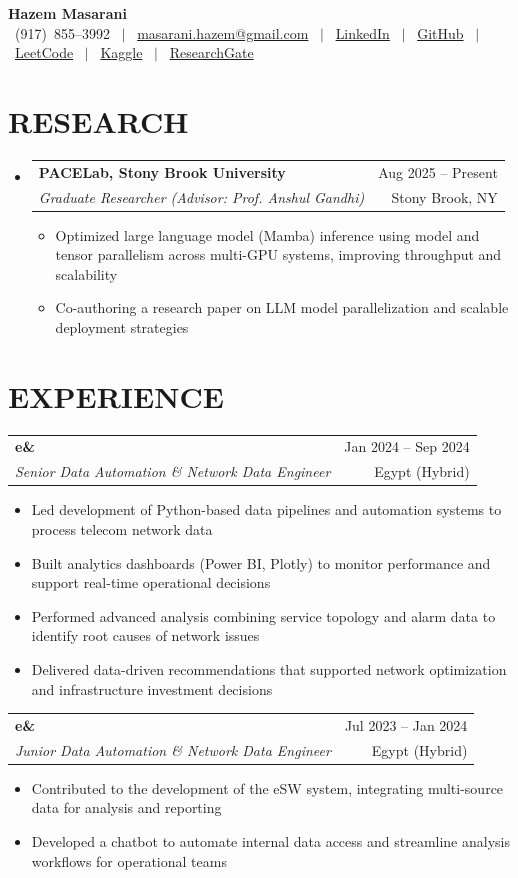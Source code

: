 \documentclass[letterpaper,11pt]{article}
\makeatletter
\newcommand{\resumeItem}[1]{
  \item\small{
    {#1 \vspace{-1pt}}
  }
}
\newcommand{\resumeSubheading}[4]{
  \vspace{-1pt}\item
    \begin{tabular*}{\textwidth}[t]{l@{\extracolsep{\fill}}r}
      \textbf{#1} & {\color{dark-grey}\small #2}\vspace{1pt}\\ %
      \textit{#3} & {\color{dark-grey} \small #4}\\ %
    \end{tabular*}\vspace{-4pt}
}
\newcommand{\resumeSubHeadingListStart}{\begin{itemize}[leftmargin=0in, label={}]}
\newcommand{\resumeSubHeadingListEnd}{\end{itemize}}
\newcommand{\resumeItemListStart}{\begin{itemize}}
\newcommand{\resumeItemListEnd}{\end{itemize}\vspace{0pt}}
\makeatother
\begin{document}
\begin{center}
    \textbf{\Huge Hazem Masarani} \\ \vspace{5pt}
    \small
    \faPhone*~(917)~855--3992 \ $|$
    \faEnvelope~\href{mailto:masarani.hazem@gmail.com}{masarani.hazem@gmail.com} \ $|$
    \faLinkedin~\href{https://www.linkedin.com/in/hazem-masarani-8b86931b1/}{LinkedIn} \ $|$
    \faGithub~\href{https://github.com/hazemmasarani}{GitHub} \ $|$
    \faCode~\href{https://leetcode.com/u/hazemmasarani99/}{LeetCode} \ $|$
    \faDatabase~\href{https://www.kaggle.com/hazemmasarani}{Kaggle} \ $|$
    \faDatabase~\href{https://www.researchgate.net/profile/Hazem-Masarani}{ResearchGate}
\end{center}

\section{RESEARCH}
\resumeSubHeadingListStart

\resumeSubheading
{PACELab, Stony Brook University}{Aug 2025 -- Present}
{Graduate Researcher (Advisor: Prof. Anshul Gandhi)}{Stony Brook, NY}
\resumeItemListStart
\resumeItem{Optimized large language model (Mamba) inference using model and tensor parallelism across multi-GPU systems, improving throughput and scalability}
\resumeItem{Co-authoring a research paper on LLM model parallelization and scalable deployment strategies}
\resumeItemListEnd

\resumeSubHeadingListEnd

\section{EXPERIENCE}

\resumeSubheading
{e\&}{Jan 2024 -- Sep 2024}
{Senior Data Automation \& Network Data Engineer}{Egypt (Hybrid)}
\resumeItemListStart
\resumeItem{Led development of Python-based data pipelines and automation systems to process telecom network data}
\resumeItem{Built analytics dashboards (Power BI, Plotly) to monitor performance and support real-time operational decisions}
\resumeItem{Performed advanced analysis combining service topology and alarm data to identify root causes of network issues}
\resumeItem{Delivered data-driven recommendations that supported network optimization and infrastructure investment decisions}
\resumeItemListEnd

\resumeSubheading
{e\&}{Jul 2023 -- Jan 2024}
{Junior Data Automation \& Network Data Engineer}{Egypt (Hybrid)}
\resumeItemListStart
\resumeItem{Contributed to the development of the eSW system, integrating multi-source data for analysis and reporting}
\resumeItem{Developed a chatbot to automate internal data access and streamline analysis workflows for operational teams}
\resumeItemListEnd
\end{document}
